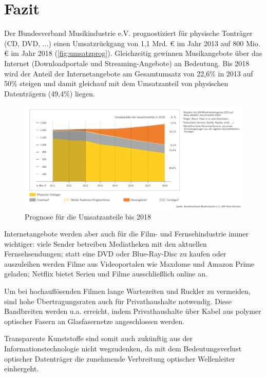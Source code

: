 \section{Fazit}
\label{sec:schluss}

Der Bundesverband Musikindustrie e.V. prognostiziert für physische Tonträger
(CD, DVD, ...) einen Umsatzrückgang von 1,1 Mrd. \euro{} im Jahr 2013 auf 800
Mio. \euro{} im Jahr 2018 (\autoref{fig:umsatzprog}). Gleichzeitig gewinnen
Musikangebote über das Internet (Downloadportale und Streaming-Angebote) an
Bedeutung. Bis 2018 wird der Anteil der Internetangebote am Gesamtumsatz von
22,6\% in 2013 auf 50\% steigen und damit gleichauf mit dem Umsatzanteil von
physischen Datenträgern (49,4\%) liegen.

\begin{figure}[h]
    \begin{center}
        \begin{minipage}[t]{\textwidth}
            \begin{center}
                \includegraphics[width=\textwidth]{Bilder/Schluss/prognose.png}
                \caption[Prognose für die Umsatzanteile bis 2018 \newline \url{http://www.musikindustrie.de/uploads/media/140325\_BVMI\_2013\_Jahrbuch\_ePaper\_V02.pdf} S.15 (zuletzt aufgerufen am 03.08.2015)]{Prognose für die Umsatzanteile bis 2018}
                \label{fig:umsatzprog}
            \end{center}
        \end{minipage}
    \end{center}
\end{figure}

Internetangebote werden aber auch für die Film- und Fernsehindustrie immer
wichtiger: viele Sender betreiben Mediatheken mit den aktuellen
Fernsehsendungen; statt eine DVD oder Blue-Ray-Disc zu kaufen oder auszuleihen
werden Filme aus Videoportalen wie Maxdome und Amazon Prime geladen; Netflix
bietet Serien und Filme ausschließlich online an.

Um bei hochauflösenden Filmen lange Wartezeiten und \glqq Ruckler\grqq{} zu
vermeiden, sind hohe Übertragungsraten auch für Privathaushalte notwendig. Diese
Bandbreiten werden u.a. erreicht, indem Privathaushalte über Kabel aus polymer
optischer Fasern an Glasfasernetze angeschlossen werden.

Transparente Kunststoffe sind somit auch zukünftig aus der
Informationstechnologie nicht wegzudenken, da mit dem Bedeutungsverlust
optischer Datenträger die zunehmende Verbreitung optischer Wellenleiter
einhergeht.
